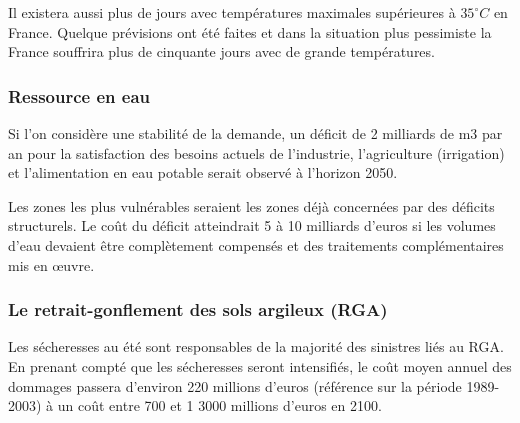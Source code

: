 \documentclass[a4paper,10pt]{article}
\begin{document}
Il  existera aussi  plus  de  jours avec  températures  maximales supérieures  à
$35^{\circ}C$ en France. Quelque prévisions
ont été faites et dans la situation plus pessimiste la France souffrira plus
de cinquante jours avec de grande températures. 





\subsubsection*{Ressource en eau}
Si l’on considère une stabilité de la demande, un déficit de 2 milliards de m3
par an  pour la satisfaction  des besoins actuels de  l’industrie, l’agriculture
(irrigation) et l’alimentation en eau potable serait observé à l’horizon 2050.

Les zones les plus vulnérables seraient les zones déjà concernées par des déficits structurels. Le coût
du déficit atteindrait 5 à 10 milliards d’euros si les volumes d’eau devaient être
complètement compensés et des traitements complémentaires mis en œuvre.

\subsubsection*{Le retrait-gonflement des sols argileux (RGA)}

Les sécheresses au été sont responsables de la majorité des sinistres liés au RGA.
En prenant compté  que les sécheresses seront intensifiés,  le coût moyen annuel
des dommages  passera d’environ 220  millions d’euros (référence sur  la période
1989-2003) à un coût entre 700 et 1 3000 millions d’euros en 2100.
\end{document}
